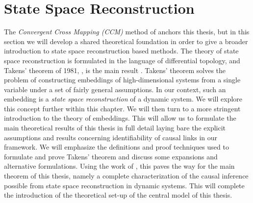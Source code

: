 \documentclass[11pt, a4paper]{memoir}
\theoremstyle{break}
\theoremstyle{break}
\theoremstyle{nonumberplain}
\begin{document}
\chapter{State Space Reconstruction}
The \textit{Convergent Cross Mapping (CCM)} method of \cite{Sugihara} anchors this thesis, but in this section we will develop a shared theoretical foundation in order to give a broader introduction to state space reconstruction based methods. The theory of state space reconstruction is formulated in the language of differential topology, and Takens' theorem of 1981, \cite{Takens}, is the main result . Takens' theorem solves the problem of constructing embeddings of high-dimensional systems from a single variable under a set of fairly general assumptions. In our context, such an embedding is a \textit{state space reconstruction} of a dynamic system. We will explore this concept further within this chapter.
We will then turn to a more stringent introduction to the theory of embeddings. This will allow us to formulate the main theoretical results of this thesis in full detail laying bare the explicit assumptions and results concerning identifiability of causal links in our framework. We will emphasize the definitions and proof techniques used to formulate and prove Takens' theorem and discuss some expansions and alternative formulations. Using the work of \cite{mathFound}, this paves the way for the main theorem of this thesis, namely a complete characterization of the causal inference possible from state space reconstruction in dynamic systems. This will complete the introduction of the theoretical set-up of the central model of this thesis.
\end{document}
